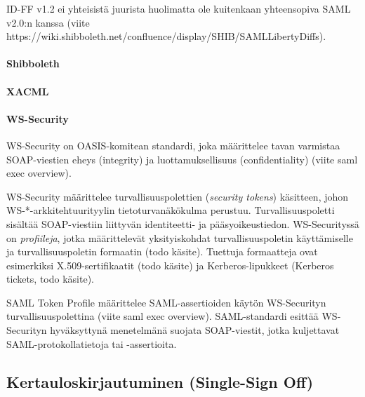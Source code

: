 \documentclass[finnish,gradu]{tktltiki}
\begin{document}
  ID-FF v1.2 ei yhteisistä juurista huolimatta ole kuitenkaan yhteensopiva SAML v2.0:n kanssa (viite https://wiki.shibboleth.net/confluence/display/SHIB/SAMLLibertyDiffs).


  \paragraph{Shibboleth} %
  \label{par:saml_vs_shibboleth}


  \paragraph{XACML} %
  \label{par:xacml}

  \paragraph{WS-Security} %
  \label{par:ws_security}
  WS-Security on OASIS-komitean standardi, joka määrittelee tavan varmistaa SOAP-viestien eheys (integrity) ja luottamuksellisuus (confidentiality) (viite saml exec overview).

  WS-Security määrittelee turvallisuuspolettien (\emph{security tokens}) käsitteen, johon WS-*-arkkitehtuurityylin tietoturvanäkökulma perustuu.
  Turvallisuuspoletti sisältää SOAP-viestiin liittyvän identiteetti- ja pääsyoikeustiedon.
  WS-Securityssä on \emph{profiileja}, jotka määrittelevät yksityiskohdat turvallisuuspoletin käyttämiselle ja turvallisuuspoletin formaatin (todo käsite).
  Tuettuja formaatteja ovat esimerkiksi X.509-sertifikaatit (todo käsite) ja Kerberos-lipukkeet (Kerberos tickets, todo käsite).

  SAML Token Profile määrittelee SAML-assertioiden käytön WS-Securityn turvallisuuspolettina (viite saml exec overview).
  SAML-standardi esittää WS-Securityn hyväksyttynä menetelmänä suojata SOAP-viestit, jotka kuljettavat SAML-protokollatietoja tai -assertioita.





  \subsection{Kertauloskirjautuminen (Single-Sign Off)} %
  \label{sub:kertauloskirjautuminen}
\end{document}
